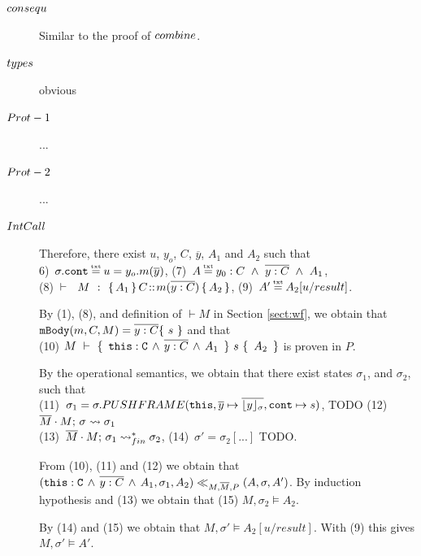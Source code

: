 \begin{description}
\item[${\sc{consequ}}$] Similar to the proof of  ${\sc{combine}}$. 

\item[${\sc{types}}$] obvious

\item[${\sc{Prot-1}}$] ...

\item[${\sc{Prot-2}}$] ...

\item[${\sc{IntCall}}$]

Therefore, there exist $u$, $y_o$, $C$, $\overline y$,  $A_1$ and $A_2$ such that \\
6)\ $\sigma.\prg{cont}\txteq u=y_o.m(\overline y)$,   \hspace{2cm}
 (7)\ $A \txteq y_0:C  \ \wedge\ \overline {y:C}\ \wedge \ A_1$, 
\\
 (8)\ ${\vdash \ \ M\ \ \mathbf{:}\ \  \{\, A_1\, \}\, C\!::\!m(\overline{y:C})\, \{\, A_2\, \}  }$,    \hspace{1cm}
 (9)\ $A' \txteq  A_2[ u/result]$. 

By (1), (8), and definition of $\vdash M$ in Section \ref{sect:wf}, we obtain that   $\prg{mBody}(m,C,M)=\overline{y:C}\{\  s \ \}$ and that\\
(10)   ${M\ \vdash\ \{\, \ \mbox{\normalfont{\texttt{this}}}:\mbox{\normalfont{\texttt{C}}}\, \wedge\, \overline{y:C}\, \wedge\, A_1\  \, \} \ s\  \{\,\ A_2\ \, \} }$ is proven in $P$.
 
 By the operational semantics, we obtain that there exist states $\sigma_1$, and $\sigma_2$, such that \\
 (11)\ $\sigma_1=\sigma.PUSHFRAME(\mbox{\normalfont{\texttt{this}}}, {\overline y} \mapsto \overline{\lfloor y \rfloor_{\sigma}},\mbox{\normalfont{\texttt{cont}}} \mapsto s) $, TODO   \hspace{1cm}
   (12)\ $\overline{M}\cdot M;\, {\sigma} \rightsquigarrow \sigma_1$ \\
 (13)\ $\overline{M}\cdot M;\, {\sigma_1} \rightsquigarrow^*_{fin} \sigma_2$,   \hspace{3cm}
 (14)\ $\sigma'=\sigma_2[...]$ TODO.
 
 From (10), (11) and (12) we obtain that $( \mbox{\normalfont{\texttt{this}}}:\mbox{\normalfont{\texttt{C}}}\, \wedge\, \overline{y:C}\, \wedge\, A_1,\sigma_1,A_2) \ll_{M,\overline{M},P} (A,\sigma,A')$. By induction hypothesis and (13) we obtain that (15) $M,\sigma_2 \models A_2$.
 
 By (14) and  (15) we obtain that $M,\sigma' \models A_2[ u/result]$. With (9) this gives $M,\sigma' \models A'$.


\end{description}

